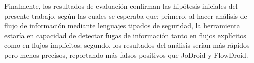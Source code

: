 Finalmente, los resultados de evaluación confirman las hipótesis iniciales
del presente trabajo, según las cuales se esperaba que: primero, al hacer análisis
de flujo de información mediante lenguajes tipados de seguridad, la herramienta estaría en
capacidad de detectar fugas de información tanto en flujos explícitos como en
flujos implícitos; segundo, los resultados del análisis serían más rápidos pero
menos precisos, reportando más falsos positivos que JoDroid y FlowDroid.\newline